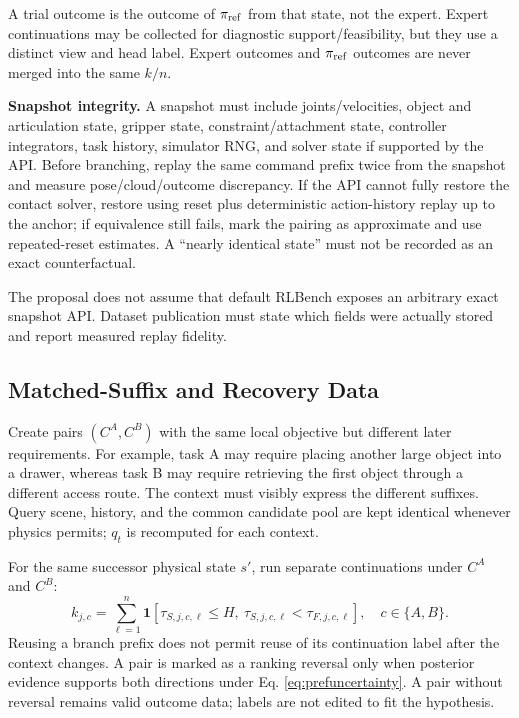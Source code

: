 \documentclass[
  10pt,
]{article}
\begin{document}
A trial outcome is the outcome of \(\pi_{\rm ref}\) from that state, not the expert. Expert continuations may be collected for diagnostic support/feasibility, but they use a distinct view and head label. Expert outcomes and \(\pi_{\rm ref}\) outcomes are never merged into the same \(k/n\).

\textbf{Snapshot integrity.} A snapshot must include joints/velocities, object and articulation state, gripper state, constraint/attachment state, controller integrators, task history, simulator RNG, and solver state if supported by the API. Before branching, replay the same command prefix twice from the snapshot and measure pose/cloud/outcome discrepancy. If the API cannot fully restore the contact solver, restore using reset plus deterministic action-history replay up to the anchor; if equivalence still fails, mark the pairing as approximate and use repeated-reset estimates. A ``nearly identical state'' must not be recorded as an exact counterfactual.

The proposal does not assume that default RLBench exposes an arbitrary exact snapshot API. Dataset publication must state which fields were actually stored and report measured replay fidelity.

\hypertarget{dux1eef-liux1ec7u-matched-suffix-vuxe0-recovery}{%
\subsection{Matched-Suffix and Recovery Data}\label{dux1eef-liux1ec7u-matched-suffix-vuxe0-recovery}}

Create pairs \((C^A,C^B)\) with the same local objective but different later requirements. For example, task A may require placing another large object into a drawer, whereas task B may require retrieving the first object through a different access route. The context must visibly express the different suffixes. Query scene, history, and the common candidate pool are kept identical whenever physics permits; \(q_t\) is recomputed for each context.

For the same successor physical state \(s'\), run separate continuations under \(C^A\) and \(C^B\):
\begin{equation}\label{eq:suffixlabel}
k_{j,c}=\sum_{\ell=1}^{n}
\mathbf1[\tau_{S,j,c,\ell}\leq H,\ \tau_{S,j,c,\ell}<\tau_{F,j,c,\ell}],
\quad c\in\{A,B\}.
\end{equation}
Reusing a branch prefix does not permit reuse of its continuation label after the context changes. A pair is marked as a ranking reversal only when posterior evidence supports both directions under Eq. \eqref{eq:prefuncertainty}. A pair without reversal remains valid outcome data; labels are not edited to fit the hypothesis.
\end{document}
